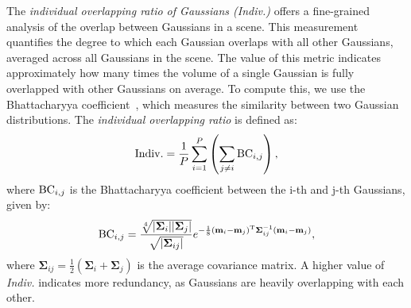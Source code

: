 The \textit{individual overlapping ratio of Gaussians (Indiv.)} offers a fine-grained analysis of the overlap between Gaussians in a scene. 
This measurement quantifies the degree to which each Gaussian overlaps with all other Gaussians, averaged across all Gaussians in the scene. 
The value of this metric indicates approximately how many times the volume of a single Gaussian is fully overlapped with other Gaussians on average.
To compute this, we use the Bhattacharyya coefficient~\cite{bhattacharyya1943bhatcoef}, which measures the similarity between two Gaussian distributions. 
The \textit{individual overlapping ratio} is defined as:
\begin{equation}
   {\rm Indiv.} = \frac{1}{P}\sum_{i=1}^{P}\left(\sum_{j\ne i}{\rm BC}_{i,j}\right),
    \label{eq: indiv}
\end{equation}
where ${\rm BC}_{i,j}$ is the Bhattacharyya coefficient between the i-th and j-th Gaussians, given by:
\begin{equation}
   {\rm BC}_{i,j} = \frac{\sqrt[4]{|\mathbf{\Sigma}_i||\mathbf{\Sigma}_j|}}{\sqrt{|\mathbf{\Sigma}_{ij}|}}e^{-\frac{1}{8}(\mathbf{m}_i-\mathbf{m}_j)^{\rm T}\mathbf{\Sigma}_{ij}^{-1}(\mathbf{m}_i-\mathbf{m}_j)},
   \label{eq: Batta}
\end{equation}
where $\mathbf{\Sigma}_{ij}=\frac{1}{2}(\mathbf{\Sigma}_i+\mathbf{\Sigma}_j)$ is the average covariance matrix.
A higher value of \textit{Indiv.} indicates more redundancy, as Gaussians are heavily overlapping with each other.
